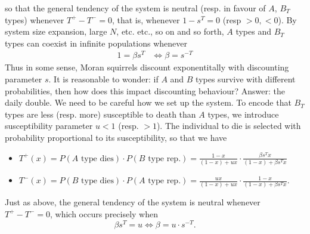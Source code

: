 so that the general tendency of the system is neutral (resp. in favour of $A$, $B_T$ types) whenever $T^+ - T^- = 0$, that is, whenever
$1 - s^{T} = 0$ (resp $>0, <0$). 
By system size expansion, large $N$, etc. etc., so on and so forth, $A$ types and $B_T$ types can coexist in infinite populations whenever
\begin{align*}
    1 = \beta s^{T} &\iff \beta = s^{-T}
\end{align*}
Thus in some sense, Moran squirrels discount exponentitally with discounting parameter $s$. It is reasonable to wonder: if $A$ and $B$ types
survive with different probabilities, then how does this impact discounting behaviour? Answer: the daily double. We need to be careful how we set
up the system. To encode that $B_T$ types are less (resp. more) susceptible to death than $A$ types, we introduce susceptibility parameter $u < 1$
(resp. $> 1$). The individual to die is selected with probability proportional to its susceptibility, so that we have
\begin{itemize}
    \item $T^+(x) = P\left( A \text{ type dies} \right)\cdot P( B \text{ type rep.}) = \frac{1-x}{(1-x) + ux}\cdot \frac{\beta s^T x}{(1-x) + \beta s^T x}$
    \item $T^-(x) = P\left( B \text{ type dies} \right)\cdot P( A \text{ type rep.}) = 
        \frac{ux}{(1-x) + ux}\cdot \frac{1 - x}{(1 - x) + \beta s^T x}$.
\end{itemize}
Just as above, the general tendency of the system is neutral whenever $T^+ - T^- = 0$, which occurs precisely when 
$$ \beta s^T = u \iff \beta = u\cdot s^{-T}.$$
